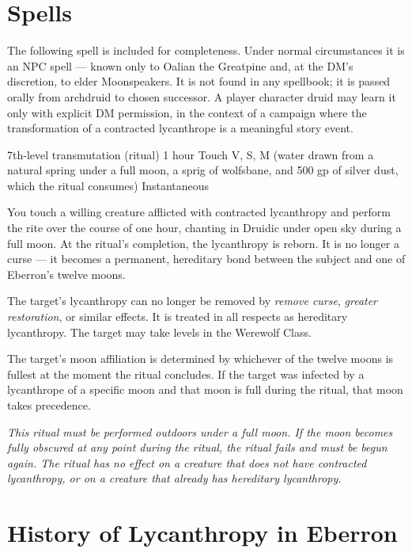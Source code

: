 \documentclass[twocolumn]{dndbook}
\begin{document}
\section*{Spells}

The following spell is included for completeness.
Under normal circumstances it is an NPC spell --- known only to Oalian the Greatpine and, at the DM's discretion, to elder Moonspeakers.
It is not found in any spellbook; it is passed orally from archdruid to chosen successor.
A player character druid may learn it only with explicit DM permission, in the context of a campaign where the transformation of a contracted lycanthrope is a meaningful story event.\par

\label{spell:rite-of-olarune}
  {7th-level transmutation (ritual)}
  {1 hour}
  {Touch}
  {V, S, M (water drawn from a natural spring under a full moon, a sprig of wolfsbane, and 500 gp of silver dust, which the ritual consumes)}
  {Instantaneous}

You touch a willing creature afflicted with contracted lycanthropy and perform the rite over the course of one hour, chanting in Druidic under open sky during a full moon.
At the ritual's completion, the lycanthropy is reborn.
It is no longer a curse --- it becomes a permanent, hereditary bond between the subject and one of Eberron's twelve moons.\par

The target's lycanthropy can no longer be removed by \emph{remove curse}, \emph{greater restoration}, or similar effects.
It is treated in all respects as hereditary lycanthropy.
The target may take levels in the Werewolf Class.\par

The target's moon affiliation is determined by whichever of the twelve moons is fullest at the moment the ritual concludes.
If the target was infected by a lycanthrope of a specific moon and that moon is full during the ritual, that moon takes precedence.\par

\textit{This ritual must be performed outdoors under a full moon.
If the moon becomes fully obscured at any point during the ritual, the ritual fails and must be begun again.
The ritual has no effect on a creature that does not have contracted lycanthropy, or on a creature that already has hereditary lycanthropy.}\par

\section*{History of Lycanthropy in Eberron}\label{sec:history}
\end{document}
